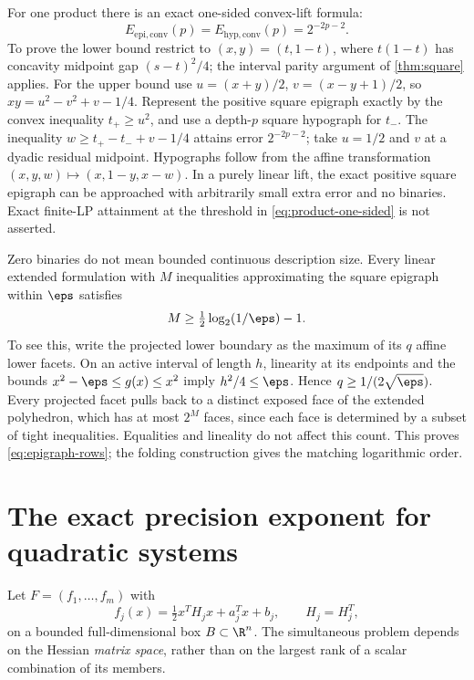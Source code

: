 For one product there is an exact one-sided convex-lift formula:
\begin{equation}\label{eq:product-one-sided}
 E_{\mathrm{epi,conv}}(p)=E_{\mathrm{hyp,conv}}(p)=2^{-2p-2}.
\end{equation}
To prove the lower bound restrict to $(x,y)=(t,1-t)$, where
$t(1-t)$ has concavity midpoint gap $(s-t)^2/4$; the interval parity
argument of \cref{thm:square} applies. For the upper bound use
$u=(x+y)/2$, $v=(x-y+1)/2$, so
$xy=u^2-v^2+v-1/4$. Represent the positive square epigraph exactly by
the convex inequality $t_+\ge u^2$, and use a depth-$p$ square
hypograph for $t_-$. The inequality
$w\ge t_+-t_-+v-1/4$ attains error $2^{-2p-2}$; take $u=1/2$ and
$v$ at a dyadic residual midpoint. Hypographs follow from the affine
transformation $(x,y,w)\mapsto(x,1-y,x-w)$. In a purely linear lift,
the exact positive square epigraph can be approached with arbitrarily
small extra error and no binaries. Exact finite-LP attainment at the
threshold in \eqref{eq:product-one-sided} is not asserted.

Zero binaries do not mean bounded continuous description size. Every
linear extended formulation with $M$ inequalities approximating the
square epigraph within $\eps$ satisfies
\begin{equation}\label{eq:epigraph-rows}
 M\ge\tfrac12\log_2(1/\eps)-1.
\end{equation}
To see this, write the projected lower boundary as the maximum of its
$q$ affine lower facets. On an active interval of length $h$, linearity
at its endpoints and the bounds $x^2-\eps\le g(x)\le x^2$ imply
$h^2/4\le\eps$. Hence $q\ge1/(2\sqrt\eps)$. Every projected facet
pulls back to a distinct exposed face of the extended polyhedron, which
has at most $2^M$ faces, since each face is determined by a subset of
tight inequalities. Equalities and lineality do not affect this count.
This proves \eqref{eq:epigraph-rows}; the folding construction gives
the matching logarithmic order.

\section{The exact precision exponent for quadratic systems}\label{sec:ncrank}

Let $F=(f_1,\ldots,f_m)$ with
\[
 f_j(x)=\tfrac12x^TH_jx+a_j^Tx+b_j,\qquad H_j=H_j^T,
\]
on a bounded full-dimensional box $B\subset\R^n$. The simultaneous
problem depends on the Hessian \emph{matrix space}, rather than on the
largest rank of a scalar combination of its members.

